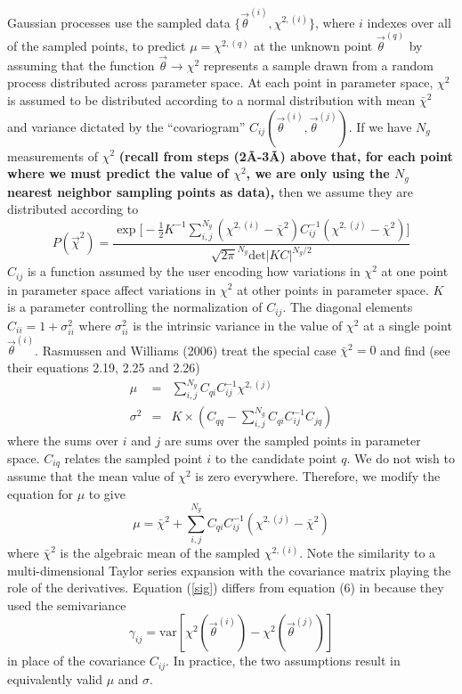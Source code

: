 \documentclass[useAMS,usenatbib]{aastex}
\begin{document}
Gaussian processes use the sampled data $\{\vec{\theta}^{(i)},\chi^{2,(i)}\}$, 
where $i$ indexes over all of the sampled points, to predict
$\mu=\chi^{2,(q)}$ at the unknown point 
$\vec{\theta}^{(q)}$ by assuming that the function
$\vec{\theta}\rightarrow\chi^2$ represents a sample drawn from a random process 
distributed
across parameter space.  At each point in parameter space, 
$\chi^2$ is assumed to be
distributed according to a normal distribution with mean 
$\bar{\chi}^2$
and variance dictated by the ``covariogram''
$C_{ij}(\vec{\theta}^{(i)},\vec{\theta}^{(j)})$.
If we have $N_g$ measurements of $\chi^2$ 
{\bf %
(recall from steps (2\~A-3\~A) above that, for
each point where we must predict the value of $\chi^2$, we are only using the $N_g$
nearest neighbor sampling points as data),
}%
 then we assume
they are distributed according to
\begin{equation}
\label{eqn:likelihood}
P(\vec{\chi}^2)=
\frac{\exp\bigg[-\frac{1}{2}K^{-1}\sum_{i,j}^{N_g}
(\chi^{2,(i)}-\bar{\chi}^2)C^{-1}_{ij}
(\chi^{2,(j)}-\bar{\chi}^2)\bigg]}{\sqrt{2\pi}^{N_g}\text{det}|KC|^{N_g/2}}
\end{equation}
$C_{ij}$ is a function assumed by the user encoding how variations in
$\chi^2$ at one point in parameter space affect variations in 
$\chi^2$ at other
points in parameter space.  $K$ is a parameter controlling the
normalization of $C_{ij}$.
The diagonal elements $C_{ii}=1+\sigma^2_{ii}$ where 
$\sigma^2_{ii}$ is the intrinsic variance in the value
of $\chi^2$ at a single point $\vec{\theta}^{(i)}$.  
Rasmussen and Williams (2006) treat 
the special case
$\bar{\chi}^2=0$ and find (see their equations 2.19, 2.25 and 2.26)
\begin{eqnarray}
\mu&=&\sum_{i,j}^{N_g} C_{qi}C^{-1}_{ij}\chi^{2,(j)}\nonumber\\
\sigma^2&=&K\times\left(C_{qq}-\sum_{i,j}^{N_g}C_{qi}C^{-1}_{ij}C_{jq}\right)\label{sig}
\end{eqnarray}
where the sums over $i$ and $j$ are sums over the sampled points 
in parameter space.  $C_{iq}$ relates the sampled point $i$ to the candidate
point $q$.
We do not wish to assume that the mean value of $\chi^2$ is zero everywhere.
Therefore, we modify the equation for $\mu$ to give
\begin{equation}
\label{mu}
\mu=\bar{\chi}^2+\sum_{i,j}^{N_g} C_{qi}C^{-1}_{ij}
(\chi^{2,(j)}-\bar{\chi}^2)
\end{equation}
where $\bar{\chi}^2$ is the algebraic mean of the 
sampled $\chi^{2,(i)}$.
Note the similarity to a multi-dimensional Taylor series expansion with the
covariance matrix playing the role of the derivatives.
Equation (\ref{sig}) differs from equation (6) in \cite{bryan} because
they used the semivariance
$$\gamma_{ij}=\text{var}[\chi^2(\vec{\theta}^{(i)})
-\chi^2(\vec{\theta}^{(j)})]$$
in place of the covariance $C_{ij}$.  In practice, the two assumptions result in
equivalently valid $\mu$ and $\sigma$.
\end{document}
